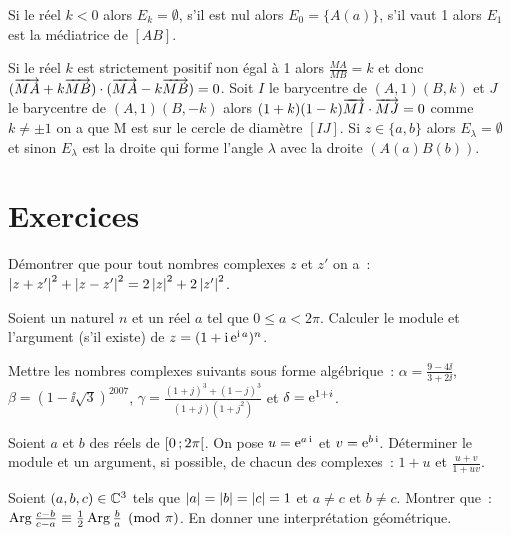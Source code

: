 Si le réel \(k<0\) alors \(E_k = \emptyset\), s'il est nul alors \(E_0 = \{A(a)\}\), 
s'il vaut 1 alors \(E_1\) est la médiatrice de \([AB]\).

Si le réel \(k\) est strictement positif non égal à 1 alors \(\frac{MA}{MB} = k\) 
et donc \((\overrightarrow{MA} + k\overrightarrow{MB}) \cdot (\overrightarrow{MA}-k\overrightarrow{MB}) = 0\). Soit \(I\) le 
barycentre de \((A,1)(B,k)\) et \(J\) le barycentre de \((A,1)(B,-k)\) alors 
\((1 + k)(1-k) \overrightarrow{MI} \cdot \overrightarrow{MJ}  = 0\) comme \(k \neq \pm 1\) on a que M 
est sur le cercle de diamètre \([IJ]\).
Si \(z \in \{a,b\}\) alors \(E_\lambda = \emptyset\) et sinon \(E_\lambda\) est la 
droite qui forme l'angle \(\lambda\) avec la droite \((A(a)B(b))\).

\section{Exercices}

\begin{exercice}
    Démontrer que pour tout nombres complexes \(z\) et \(z'\) on 
    a~:\(\left\lvert z + z'\right\rvert^2 + \left\lvert z-z'\right\rvert^2 = 2\left\lvert z\right\rvert^2 + 2\left\lvert z'\right\rvert^2\).
\end{exercice}

\begin{exercice}
    Soient un naturel \(n\) et un réel \(a\) tel que \(0 \leqslant a < 2\pi\). 
    Calculer le module et l'argument (s'il existe) de \(z = (1 + \operatorname{i}\operatorname{e}^{\operatorname{i} 
    a})^n\).
\end{exercice}

\begin{exercice}
    Mettre les nombres complexes suivants sous forme algébrique~: \(\alpha = 
    \frac{9-4\ii}{3 + 2\ii}\), \(\beta = (1-\ii\sqrt{3})^{2007}\), \(\gamma = 
    \frac{(1 + j)^3 + (1-j)^3}{(1 + j)(1 + j^2)}\) et \( \delta = \operatorname{e}^{1 + i}\).
\end{exercice}

\begin{exercice}
    Soient \(a\) et \(b\) des réels de \(\left[ 0 \, ;  2\pi \right[\). On pose 
    \(u = \operatorname{e}^{a\operatorname{i}}\) et \(v = \operatorname{e}^{b\operatorname{i}}\). Déterminer le module et un argument, si 
    possible, de chacun des complexes~: \(1 + u\) et \(\frac{u + v}{1 + uv}\).
\end{exercice}

\begin{exercice}
    Soient \((a, b, c) \in \mathbb{C}^3\) tels que \(\left\lvert a\right\rvert = \left\lvert b\right\rvert = \left\lvert c\right\rvert = 1\) 
    et \(a \neq c\) et \(b \neq c\). Montrer que~:\(\operatorname{Arg} \frac{c-b}{c-a} \equiv 
    \frac{1}{2} \operatorname{Arg} \frac{b}{a} \pmod \pi\). En donner une interprétation 
    géométrique.
\end{exercice}

